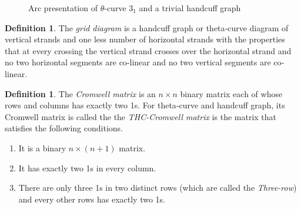 \documentclass{article}
\theoremstyle{definition}
\newtheorem{defn}[thm]{Definition}
\theoremstyle{theorem}
\theoremstyle{proposition}
\theoremstyle{corollary}
\begin{document}
\begin{figure}[h]
    \centering
    \caption{Arc presentation of $\theta$-curve $3_1$ and a trivial handcuff graph}
    \label{figure_1} 
\end{figure}


\begin{defn}
    The \textit{grid diagram} is a handcuff graph or theta‐curve diagram of vertical strands and one less number of horizontal strands with the properties that at every crossing the vertical strand crosses over the horizontal strand and no two horizontal segments are co‐linear and no two vertical segments are co‐linear.
\end{defn}

\begin{defn}
   The \textit{Cromwell matrix} is an $n \times n$ binary matrix each of whose rows and columns has exactly two 1s. 
   For theta‐curve and handcuff graph, its Cromwell matrix is called the 
   the \textit{THC-Cromwell matrix} is the matrix that satisfies the following conditions.
\end{defn}
\begin{enumerate}
    \item It is a binary $n\times(n+1)$ matrix.
    \item It has exactly two 1s in every column.
    \item There are only three 1s in two distinct rows (which are called the \textit{Three-row}) and every other rows has exactly two 1s.
\end{enumerate}
\end{document}
